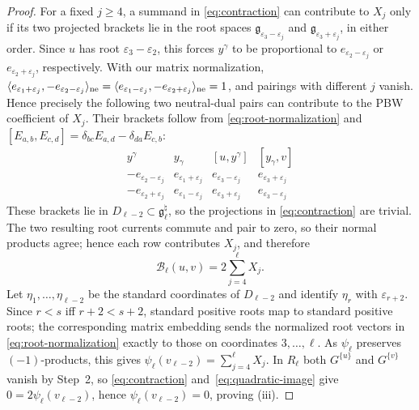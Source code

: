 \documentclass[11pt]{article}
\newcommand{\g}{\mathfrak g}
\begin{document}
\begin{proof}
For a fixed $j\ge4$, a summand in \eqref{eq:contraction}
can contribute to $X_j$ only if its two projected brackets
lie in the root spaces
$\g_{\varepsilon_3-\varepsilon_j}$ and
$\g_{\varepsilon_3+\varepsilon_j}$, in either order.
Since $u$ has root $\varepsilon_3-\varepsilon_2$,
this forces $y^\gamma$ to be proportional to
$e_{\varepsilon_2-\varepsilon_j}$ or
$e_{\varepsilon_2+\varepsilon_j}$, respectively.
With our matrix normalization,
$\langle e_{\varepsilon_1+\varepsilon_j},-e_{\varepsilon_2-\varepsilon_j}\rangle_{\rm ne}
=\langle e_{\varepsilon_1-\varepsilon_j},-e_{\varepsilon_2+\varepsilon_j}\rangle_{\rm ne}=1$,
and pairings with different $j$ vanish.  Hence precisely the following two
neutral-dual pairs can contribute to the PBW coefficient of $X_j$.
Their brackets follow from \eqref{eq:root-normalization} and
$[E_{a,b},E_{c,d}]=\delta_{bc}E_{a,d}-\delta_{da}E_{c,b}$:
$$
\begin{array}{c|c|c|c}
 y^\gamma & y_\gamma & [u,y^\gamma] & [y_\gamma,v]\\ \hline
 -e_{\varepsilon_2-\varepsilon_j} & e_{\varepsilon_1+\varepsilon_j}
 & e_{\varepsilon_3-\varepsilon_j}
 & e_{\varepsilon_3+\varepsilon_j}\\
 -e_{\varepsilon_2+\varepsilon_j} & e_{\varepsilon_1-\varepsilon_j}
 & e_{\varepsilon_3+\varepsilon_j}
 & e_{\varepsilon_3-\varepsilon_j}
\end{array}
$$
These brackets lie in $D_{\ell-2}\subset\g_\ell^\natural$, so the
projections in \eqref{eq:contraction} are trivial.  The two resulting root
currents commute and pair to zero, so their normal products agree; hence
each row contributes $X_j$, and therefore
\begin{equation}\label{eq:quadratic-image}
 \mathcal B_\ell(u,v)=2\sum_{j=4}^{\ell}X_j.
\end{equation}
Let $\eta_1,\ldots,\eta_{\ell-2}$ be the standard coordinates of
$D_{\ell-2}$ and identify $\eta_r$ with $\varepsilon_{r+2}$.  Since
$r<s$ iff $r+2<s+2$, standard positive roots map to standard positive roots;
the corresponding matrix embedding sends the normalized root vectors in
\eqref{eq:root-normalization} exactly to those on coordinates
$3,\ldots,\ell$.  As $\psi_\ell$ preserves $(-1)$-products, this gives
$\psi_\ell(v_{\ell-2})=\sum_{j=4}^{\ell}X_j$.
In $R_\ell$ both $G^{\{u\}}$ and $G^{\{v\}}$ vanish by Step~2, so
\eqref{eq:contraction} and~\eqref{eq:quadratic-image} give
$0=2\psi_\ell(v_{\ell-2})$, hence $\psi_\ell(v_{\ell-2})=0$, proving \textup{(iii)}.
\end{proof}
\end{document}
